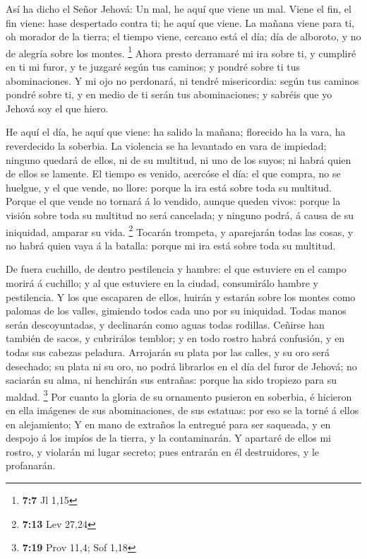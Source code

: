  Así ha dicho el Señor Jehová: Un mal, he aquí que viene un
mal.  Viene el fin, el fin viene: hase despertado contra ti;
he aquí que viene.  La mañana viene para ti, oh morador de
la tierra; el tiempo viene, cercano está el día; día de alboroto, y no
de alegría sobre los montes. \footnote{\textbf{7:7} Jl 1,15}
 Ahora presto derramaré mi ira sobre ti, y cumpliré en ti mi
furor, y te juzgaré según tus caminos; y pondré sobre ti tus
abominaciones.  Y mi ojo no perdonará, ni tendré
misericordia: según tus caminos pondré sobre ti, y en medio de ti serán
tus abominaciones; y sabréis que yo Jehová soy el que hiero.

 He aquí el día, he aquí que viene: ha salido la mañana;
florecido ha la vara, ha reverdecido la soberbia.  La
violencia se ha levantado en vara de impiedad; ninguno quedará de ellos,
ni de su multitud, ni uno de los suyos; ni habrá quien de ellos se
lamente.  El tiempo es venido, acercóse el día: el que
compra, no se huelgue, y el que vende, no llore: porque la ira está
sobre toda su multitud.  Porque el que vende no tornará á
lo vendido, aunque queden vivos: porque la visión sobre toda su multitud
no será cancelada; y ninguno podrá, á causa de su iniquidad, amparar su
vida. \footnote{\textbf{7:13} Lev 27,24}  Tocarán trompeta,
y aparejarán todas las cosas, y no habrá quien vaya á la batalla: porque
mi ira está sobre toda su multitud.

 De fuera cuchillo, de dentro pestilencia y hambre: el que
estuviere en el campo morirá á cuchillo; y al que estuviere en la
ciudad, consumirálo hambre y pestilencia.  Y los que
escaparen de ellos, huirán y estarán sobre los montes como palomas de
los valles, gimiendo todos cada uno por su iniquidad. 
Todas manos serán descoyuntadas, y declinarán como aguas todas rodillas.
 Ceñirse han también de sacos, y cubrirálos temblor; y en
todo rostro habrá confusión, y en todas sus cabezas peladura.
 Arrojarán su plata por las calles, y su oro será
desechado; su plata ni su oro, no podrá librarlos en el día del furor de
Jehová; no saciarán su alma, ni henchirán sus entrañas: porque ha sido
tropiezo para su maldad. \footnote{\textbf{7:19} Prov 11,4; Sof 1,18}
 Por cuanto la gloria de su ornamento pusieron en soberbia,
é hicieron en ella imágenes de sus abominaciones, de sus estatuas: por
eso se la torné á ellos en alejamiento;  Y en mano de
extraños la entregué para ser saqueada, y en despojo á los impíos de la
tierra, y la contaminarán.  Y apartaré de ellos mi rostro,
y violarán mi lugar secreto; pues entrarán en él destruidores, y le
profanarán.

